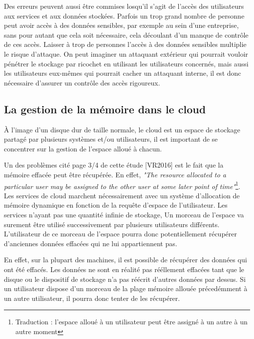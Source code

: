 \documentclass[a4paper, 12pt]{article}
\begin{document}
      Des erreurs peuvent aussi être commises losqu'il s'agit de l'accès des
      utilisateurs aux services et aux données stockées. Parfois un trop grand
      nombre de personne peut avoir accès à des données sensibles, par exemple
      au sein d'une entreprise, sans pour autant que cela soit nécessaire, cela
      découlant d'un manque de contrôle de ces accès. Laisser à trop de
      personnes l'accès à des données sensibles multiplie le risque d'attaque.
      On peut imaginer un attaquant extérieur qui pourrait vouloir pénétrer le
      stockage par ricochet en utilisant les utilisateurs concernés, mais aussi
      les utilisateurs eux-mêmes qui pourrait cacher un attaquant interne, il
      est donc nécessaire d'assurer un contrôle des accès rigoureux.

    \subsection{La gestion de la mémoire dans le cloud}
      À l'image d'un disque dur de taille normale, le cloud est un espace de
      stockage partagé par plusieurs systèmes et/ou utilisateurs, il est
      important de se concentrer sur la gestion de l'espace alloué à chacun.

      Un des problèmes cité page 3/4 de cette étude [VR2016] est le fait que la
      mémoire effacée peut être récupérée. En effet, \textit{"The resource
      allocated to a particular user may be assigned to the other user at some
      later point of time"}\footnote{Traduction : l'espace alloué à un
      utilisateur peut être assigné à un autre à un autre moment}. Les services
      de cloud marchent nécessairement avec un système d'allocation de mémoire
      dynamique en fonction de la requête d'espace de l'utilisateur. Les
      services n'ayant pas une quantité infinie de stockage, Un morceau de
      l'espace va surement être utilisé successivement par plusieurs
      utilisateurs différents. L'utilisateur de ce morceau de l'espace pourra
      donc potentiellement récupérer d'anciennes données effacées qui ne lui
      appartiennent pas.

      En effet, sur la plupart des machines, il est possible de récupérer des
      données qui ont été effacés. Les données ne sont en réalité pas rééllement
      effacées tant que le disque ou le dispositif de stockage n'a pas réécrit
      d'autres données par dessus. Si un utilisateur dispose d'un morceau de la
      plage mémoire allouée précedémment à un autre utilisateur, il pourra donc
      tenter de les récupérer. \\
\end{document}
